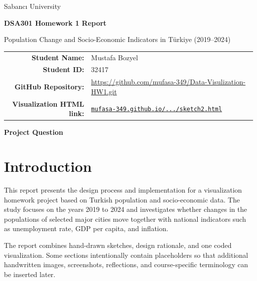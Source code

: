 \documentclass[11pt,a4paper]{article}
\newcommand{\githublink}{\url{https://github.com/mufasa-349/Data-Visulization-HW1.git}}
\begin{document}
\begin{titlepage}
    \centering
    {\Large Sabancı University \par}
    \vspace{1.2cm}
    {\LARGE \textbf{DSA301 Homework 1 Report} \par}
    \vspace{0.8cm}
    {\large Population Change and Socio-Economic Indicators in Türkiye (2019--2024)\par}
    \vspace{1.5cm}

    \begin{tabular}{rp{}}
        \textbf{Student Name:} & Mustafa Bozyel \\
        \textbf{Student ID:} & 32417 \\
        \textbf{GitHub Repository:} & \githublink \\
        \textbf{Visualization HTML link:} & \href{https://mufasa-349.github.io/Data-Visulization-HW1/sketch2.html}{\texttt{mufasa-349.github.io/.../sketch2.html}} \\
    \end{tabular}

    \vfill

    \textbf{Project Question}\\[0.4em]

    \vfill
\end{titlepage}

\tableofcontents
\newpage

\section{Introduction}

This report presents the design process and implementation for a visualization homework project based on Turkish population and socio-economic data. The study focuses on the years 2019 to 2024 and investigates whether changes in the populations of selected major cities move together with national indicators such as unemployment rate, GDP per capita, and inflation.

The report combines hand-drawn sketches, design rationale, and one coded visualization. Some sections intentionally contain placeholders so that additional handwritten images, screenshots, reflections, and course-specific terminology can be inserted later.
\end{document}
